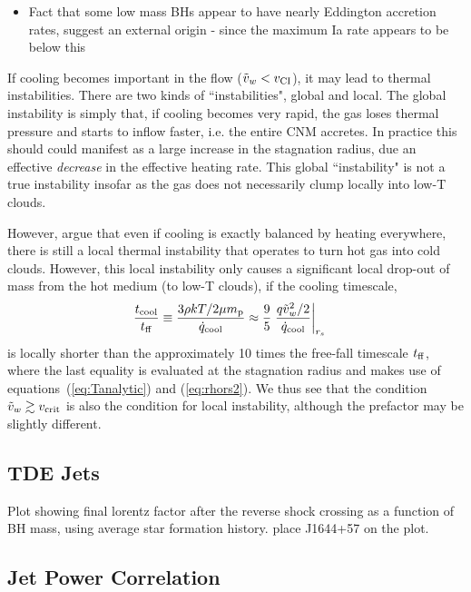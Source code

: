 \documentclass[usenatbib,fleqn]{mn2e}
\newcommand{\rs}{r_s}
\newcommand{\vw}{\tilde{v}_{w}}
\renewcommand{\mp}{m_{\rm p}}
\newcommand{\tcool}{t_{\rm cool}}
\newcommand{\tff}{t_{\rm ff}}
\begin{document}
\begin{itemize}
\item{Fact that some low mass BHs appear to have nearly Eddington accretion rates, suggest an external origin - since the maximum Ia rate appears to be below this}
\end{itemize}

If cooling becomes important in the flow ($\tilde{v}_{w} < v_{\rm CI}$), it may lead to thermal instabilities.  There are two kinds of ``instabilities", global and local.  The global instability is simply that, if cooling becomes very rapid, the gas loses thermal pressure and starts to inflow faster, i.e. the entire CNM accretes.  In
practice this should could manifest as a large increase in the stagnation radius, due an effective {\it decrease} in the effective heating rate.  This global ``instability" is not a true instability insofar as the gas does not necessarily clump locally into low-T clouds.

However, \citet{McCourt+12} argue that even if cooling is exactly
balanced by heating everywhere, there is still a local thermal
instability that operates to turn hot gas into cold clouds.  However,
this local instability only causes a significant local drop-out of
mass from the hot medium (to low-T clouds), if the cooling timescale,
\begin{align}
\frac{\tcool}{\tff} &\equiv \frac{3\rho k T/2 \mu \mp}{\dot{q}_{\rm cool}} \approx \frac{9}{5} \left. \frac{q \vw^2/2}{\dot{q}_{\rm cool}}\right|_{\rs}
\end{align} 
is locally shorter than the approximately 10 times the free-fall
timescale $t_{\rm ff}$, where the last equality is evaluated at the
stagnation radius and makes use of equations~(\ref{eq:Tanalytic}) and
(\ref{eq:rhors2}).  We thus see that the condition $\tilde{v}_{w} \gtrsim v_{\rm
  crit}$ is also the condition for local instability, although the
prefactor may be slightly different.

\subsection{TDE Jets}

Plot showing final lorentz factor after the reverse shock crossing as a function of BH mass, using average star formation history.  place J1644+57 on the plot.

\subsection{Jet Power Correlation}
\end{document}
